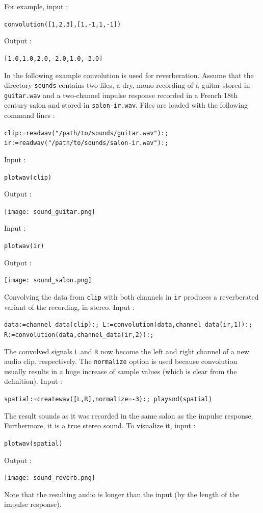 \documentclass[a4paper,11pt]{book}
\begin{document}
For example, input :
\begin{center}
	{\tt convolution([1,2,3],[1,-1,1,-1])}
\end{center}
Output :
\begin{center}
	{\tt [1.0,1.0,2.0,-2.0,1.0,-3.0]}
\end{center}

In the following example convolution is used for reverberation. Assume that the directory {\tt sounds} contains two files, a dry, mono recording of a guitar stored in {\tt guitar.wav} and a two-channel impulse response recorded in a French 18th century salon and stored in {\tt salon-ir.wav}. Files are loaded with the following command lines :
\begin{center}
  \tt clip:=readwav("/path/to/sounds/guitar.wav"):; ir:=readwav("/path/to/sounds/salon-ir.wav"):;
\end{center}
Input :
\begin{center}
  \tt plotwav(clip)
\end{center}
Output :
\begin{center}
  \texttt{[image: sound\_guitar.png]}
\end{center}
Input :
\begin{center}
  \tt plotwav(ir)
\end{center}
Output :
\begin{center}
  \texttt{[image: sound\_salon.png]}
\end{center}
Convolving the data from {\tt clip} with both channels in {\tt ir} produces a reverberated variant of the recording, in stereo. Input :
\begin{center}
  \tt data:=channel\_data(clip):; L:=convolution(data,channel\_data(ir,1)):; R:=convolution(data,channel\_data(ir,2)):;
\end{center}
The convolved signals {\tt L} and {\tt R} now become the left and right channel of a new audio clip, respectively. The {\tt normalize} option is used because convolution usually results in a huge increase of sample values (which is clear from the definition). Input :
\begin{center}
  \tt spatial:=createwav([L,R],normalize=-3):; playsnd(spatial)
\end{center}
The result sounds as it was recorded in the same salon as the impulse response. Furthermore, it is a true stereo sound. To visualize it, input :
\begin{center}
  \tt plotwav(spatial)
\end{center}
Output :
\begin{center}
  \texttt{[image: sound\_reverb.png]}
\end{center}
Note that the resulting audio is longer than the input (by the length of the impulse response).
\end{document}
